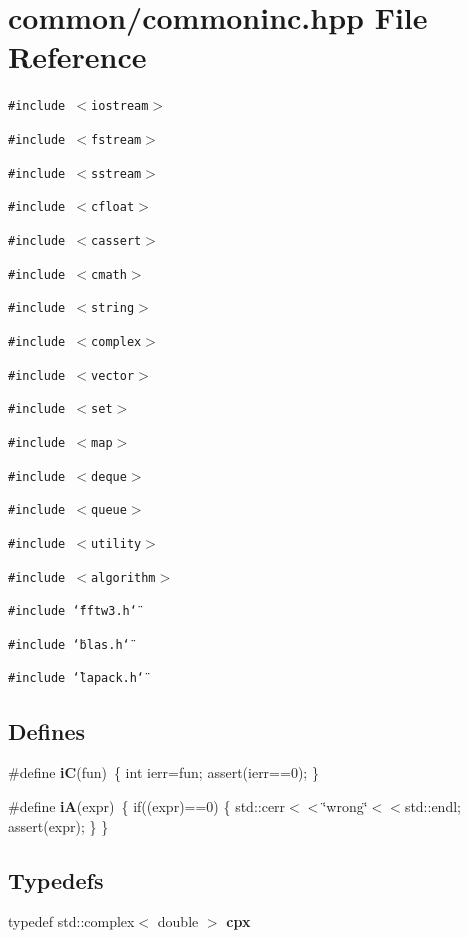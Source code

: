 \section{common/commoninc.hpp File Reference}
\label{commoninc_8hpp}


{\tt \#include $<$iostream$>$}\par
{\tt \#include $<$fstream$>$}\par
{\tt \#include $<$sstream$>$}\par
{\tt \#include $<$cfloat$>$}\par
{\tt \#include $<$cassert$>$}\par
{\tt \#include $<$cmath$>$}\par
{\tt \#include $<$string$>$}\par
{\tt \#include $<$complex$>$}\par
{\tt \#include $<$vector$>$}\par
{\tt \#include $<$set$>$}\par
{\tt \#include $<$map$>$}\par
{\tt \#include $<$deque$>$}\par
{\tt \#include $<$queue$>$}\par
{\tt \#include $<$utility$>$}\par
{\tt \#include $<$algorithm$>$}\par
{\tt \#include \char`\"{}fftw3.h\char`\"{}}\par
{\tt \#include \char`\"{}blas.h\char`\"{}}\par
{\tt \#include \char`\"{}lapack.h\char`\"{}}\par
\subsection*{Defines}
\begin{CompactItemize}
\item 
\#define {\bf i\-C}(fun)~\{ int ierr=fun; assert(ierr==0); \}
\item 
\#define {\bf i\-A}(expr)~\{ if((expr)==0) \{ std::cerr$<$$<$\char`\"{}wrong\char`\"{}$<$$<$std::endl; assert(expr); \} \}
\end{CompactItemize}
\subsection*{Typedefs}
\begin{CompactItemize}
\item 
typedef std::complex$<$ double $>$ {\bf cpx}
\end{CompactItemize}

